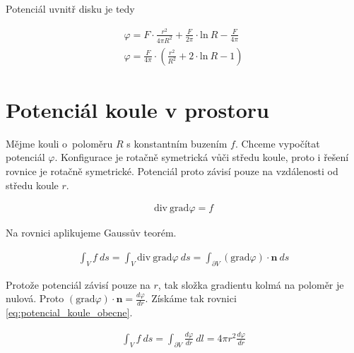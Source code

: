 \documentclass{book}
\newcommand{\vect}[1]{\boldsymbol{#1}}
\newcommand{\grad}{\mathrm{grad}}
\newcommand{\diverg}{\mathrm{div}}
\begin{document}
Potenciál uvnitř disku je tedy

\begin{equation}
\begin{split}
\varphi = F \cdot \frac{r^2}{4 \pi R^2} + \frac{F}{2 \pi} \cdot \mathrm{ln} \ R - \frac{F}{4 \pi} \\
\varphi = \frac{F}{4 \pi} \cdot \left (\frac{r^2}{R^2} + 2 \cdot \mathrm{ln} \ R - 1 \right)
\end{split}
\end{equation}


\section{Potenciál koule v prostoru}

Mějme kouli o~poloměru \(R\) s konstantním buzením \(f\). Chceme vypočítat potenciál \(\varphi\). Konfigurace je rotačně symetrická vůči středu
koule, proto i řešení rovnice je rotačně symetrické. Potenciál proto závisí pouze na vzdálenosti od středu koule \(r\).




\begin{equation}
\begin{split}
\diverg \ \grad \varphi = f
\end{split}
\end{equation}

Na rovnici aplikujeme Gaussův teorém.

\begin{equation}
\begin{split}
\int_V f \ ds = \int_V \diverg \ \grad \varphi \ ds = \int_{\partial V} (\grad \varphi) \cdot \vect{n} \ ds
\end{split}
\end{equation}

Protože potenciál závisí pouze na \(r\), tak složka gradientu kolmá na poloměr je nulová. Proto \((\grad \varphi) \cdot \vect{n} = \frac{d \varphi}{dr}\).
Získáme tak rovnici \eqref{eq:potencial_koule_obecne}.

\begin{equation}
\label{eq:potencial_koule_obecne}
\begin{split}
\int_V f \ ds = \int_{\partial V} \frac{d \varphi}{dr} \ dl = 4 \pi r^2 \frac{d \varphi}{dr}
\end{split}
\end{equation}
\end{document}
